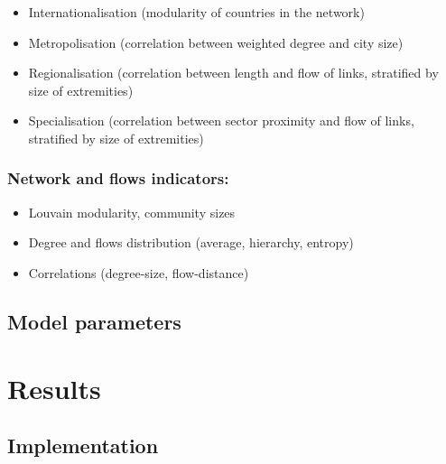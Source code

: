 \documentclass{article}
\begin{document}
\begin{itemize}
    \item Internationalisation (modularity of countries in the network)
    \item Metropolisation (correlation between weighted degree and city size)
    \item Regionalisation (correlation between length and flow of links, stratified by size of extremities)
    \item Specialisation (correlation between sector proximity and flow of links, stratified by size of extremities)
\end{itemize}


\subsubsection{Network and flows indicators:}


\begin{itemize}
    \item Louvain modularity, community sizes
    \item Degree and flows distribution (average, hierarchy, entropy)
    \item Correlations (degree-size, flow-distance)
\end{itemize}






\subsection{Model parameters}



\section{Results}

\subsection{Implementation}
\end{document}
